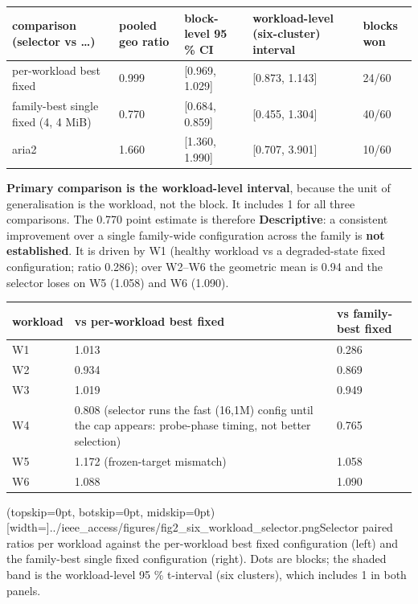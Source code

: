 \documentclass{ieeeaccess}
\begin{document}
\begin{table}[!t]\centering\scriptsize
\begin{tabularx}{\textwidth}{@{}LLLLL@{}}
\toprule
\textbf{comparison (selector vs …)} & \textbf{pooled geo ratio} & \textbf{block-level 95 \% CI} & \textbf{workload-level (six-cluster) interval} & \textbf{blocks won}\\
\midrule
per-workload best fixed & 0.999 & [0.969, 1.029] & [0.873, 1.143] & 24/60\\
family-best single fixed (4, 4 MiB) & 0.770 & [0.684, 0.859] & [0.455, 1.304] & 40/60\\
aria2 & 1.660 & [1.360, 1.990] & [0.707, 3.901] & 10/60\\
\bottomrule
\end{tabularx}
\end{table}


\textbf{Primary comparison is the workload-level interval}, because the unit of generalisation is the workload, not the block. It includes 1 for all three comparisons. The 0.770 point estimate is therefore \textbf{Descriptive}: a consistent improvement over a single family-wide configuration across the family is \textbf{not established}. It is driven by W1 (healthy workload vs a degraded-state fixed configuration; ratio 0.286); over W2–W6 the geometric mean is 0.94 and the selector loses on W5 (1.058) and W6 (1.090).


\begin{table}[!t]\centering\footnotesize
\begin{tabularx}{\textwidth}{@{}LLL@{}}
\toprule
\textbf{workload} & \textbf{vs per-workload best fixed} & \textbf{vs family-best fixed}\\
\midrule
W1 & 1.013 & 0.286\\
W2 & 0.934 & 0.869\\
W3 & 1.019 & 0.949\\
W4 & 0.808 (selector runs the fast (16,1M) config until the cap appears: probe-phase timing, not better selection) & 0.765\\
W5 & 1.172 (frozen-target mismatch) & 1.058\\
W6 & 1.088 & 1.090\\
\bottomrule
\end{tabularx}
\end{table}


\Figure[t!](topskip=0pt, botskip=0pt, midskip=0pt)[width=\columnwidth]{../ieee_access/figures/fig2_six_workload_selector.png}{Selector paired ratios per workload against the per-workload best fixed configuration (left) and the family-best single fixed configuration (right). Dots are blocks; the shaded band is the workload-level 95 \% t-interval (six clusters), which includes 1 in both panels.}
\end{document}
